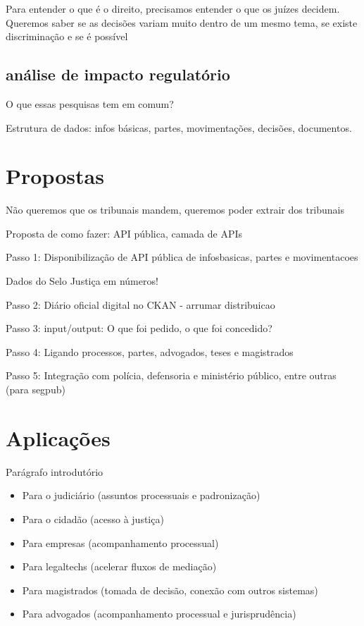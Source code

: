 \documentclass[]{report}
\providecommand{\tightlist}{%
  \setlength{\itemsep}{0pt}\setlength{\parskip}{0pt}}
\begin{document}
Para entender o que é o direito, precisamos entender o que os juízes
decidem. Queremos saber se as decisões variam muito dentro de um mesmo
tema, se existe discriminação e se é possível

\subsection{análise de impacto
regulatório}\label{analise-de-impacto-regulatorio}

O que essas pesquisas tem em comum?

Estrutura de dados: infos básicas, partes, movimentações, decisões,
documentos.

\section{Propostas}\label{propostas}

Não queremos que os tribunais mandem, queremos poder extrair dos
tribunais

Proposta de como fazer: API pública, camada de APIs

Passo 1: Disponibilização de API pública de infosbasicas, partes e
movimentacoes

Dados do Selo Justiça em números!

Passo 2: Diário oficial digital no CKAN - arrumar distribuicao

Passo 3: input/output: O que foi pedido, o que foi concedido?

Passo 4: Ligando processos, partes, advogados, teses e magistrados

Passo 5: Integração com polícia, defensoria e ministério público, entre
outras (para segpub)

\section{Aplicações}\label{aplicacoes}

Parágrafo introdutório

\begin{itemize}
\tightlist
\item
  Para o judiciário (assuntos processuais e padronização)
\item
  Para o cidadão (acesso à justiça)
\item
  Para empresas (acompanhamento processual)
\item
  Para legaltechs (acelerar fluxos de mediação)
\item
  Para magistrados (tomada de decisão, conexão com outros sistemas)
\item
  Para advogados (acompanhamento processual e jurisprudência)
\end{itemize}
\end{document}
